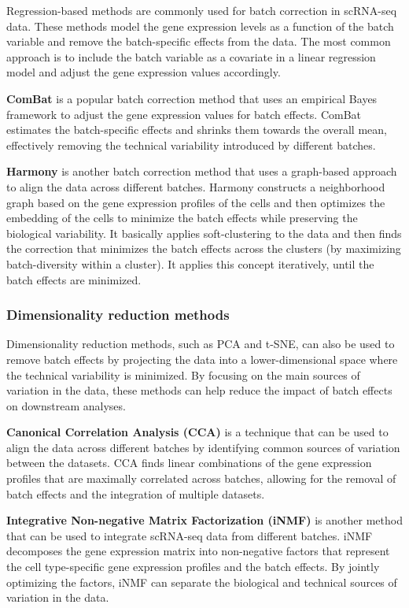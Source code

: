 \documentclass[a4paper]{article}
\begin{document}
Regression-based methods are commonly used for batch correction
in scRNA-seq data. These methods model the gene expression levels as a
function of the batch variable and remove the batch-specific effects
from the data. The most common approach is to include the batch variable
as a covariate in a linear regression model and adjust the gene expression
values accordingly.

\textbf{ComBat} is a popular batch correction method that uses an empirical
Bayes framework to adjust the gene expression values for batch effects.
ComBat estimates the batch-specific effects and shrinks them towards the
overall mean, effectively removing the technical variability introduced
by different batches.

\textbf{Harmony} is another batch correction method that uses a graph-based
approach to align the data across different batches. Harmony constructs
a neighborhood graph based on the gene expression profiles of the cells
and then optimizes the embedding of the cells to minimize the batch effects
while preserving the biological variability. It basically applies soft-clustering
to the data and then finds the correction that minimizes the batch effects
across the clusters (by maximizing batch-diversity within a cluster). 
It applies this concept iteratively, until the batch
effects are minimized.

\subsubsection*{Dimensionality reduction methods}

Dimensionality reduction methods, such as PCA and t-SNE, can also be used
to remove batch effects by projecting the data into a lower-dimensional
space where the technical variability is minimized. By focusing on the
main sources of variation in the data, these methods can help reduce the
impact of batch effects on downstream analyses.

\textbf{Canonical Correlation Analysis (CCA)} is a technique that can be
used to align the data across different batches by identifying common
sources of variation between the datasets. CCA finds linear combinations
of the gene expression profiles that are maximally correlated across
batches, allowing for the removal of batch effects and the integration
of multiple datasets.

\textbf{Integrative Non-negative Matrix Factorization (iNMF)} is another
method that can be used to integrate scRNA-seq data from different batches.
iNMF decomposes the gene expression matrix into non-negative factors that
represent the cell type-specific gene expression profiles and the batch
effects. By jointly optimizing the factors, iNMF can separate the biological
and technical sources of variation in the data.
\end{document}
